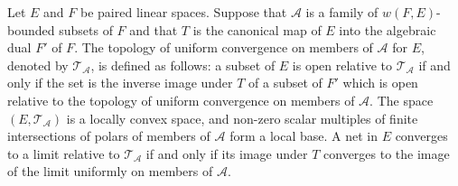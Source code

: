 Let $E$ and $F$ be paired linear spaces. Suppose that $\mathcal{A}$ is a family of $w(F,E)$-bounded subsets of $F$ and that $T$ is the canonical map of $E$ into the algebraic dual $F'$ of $F$. The topology of uniform convergence on members of $\mathcal{A}$ for $E$, denoted by $\mathcal{T}_{\mathcal{A}}$, is defined as follows: a subset of $E$ is open relative to $\mathcal{T}_{\mathcal{A}}$ if and only if the set is the inverse image under $T$ of a subset of $F'$ which is open relative to the topology of uniform convergence on members of $\mathcal{A}$. The space $(E,\mathcal{T}_{\mathcal{A}})$ is a locally convex space, and non-zero scalar multiples of finite intersections of polars of members of $\mathcal{A}$ form a local base. A net in $E$ converges to a limit relative to $\mathcal{T}_{\mathcal{A}}$ if and only if its image under $T$ converges to the image of the limit uniformly on members of $\mathcal{A}$.
